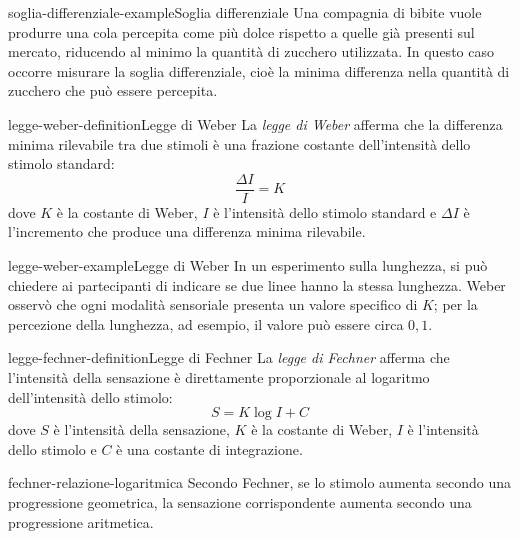 \documentclass[preview]{standalone}
\begin{document}
\begin{snippetexample}{soglia-differenziale-example}{Soglia differenziale}
    Una compagnia di bibite vuole produrre una cola percepita come più dolce
    rispetto a quelle già presenti sul mercato, riducendo al minimo la quantità
    di zucchero utilizzata. In questo caso occorre misurare la soglia
    differenziale, cioè la minima differenza nella quantità di zucchero che può
    essere percepita.
\end{snippetexample}

\begin{snippetdefinition}{legge-weber-definition}{Legge di Weber}
    La \emph{legge di Weber} afferma che la differenza minima rilevabile tra
    due stimoli è una frazione costante dell'intensità dello stimolo standard:
    \[
        \frac{\Delta I}{I} = K
    \]
    dove \(K\) è la costante di Weber, \(I\) è l'intensità dello stimolo
    standard e \(\Delta I\) è l'incremento che produce una differenza minima
    rilevabile.
\end{snippetdefinition}

\begin{snippetexample}{legge-weber-example}{Legge di Weber}
    In un esperimento sulla lunghezza, si può chiedere ai partecipanti di
    indicare se due linee hanno la stessa lunghezza. Weber osservò che ogni
    modalità sensoriale presenta un valore specifico di \(K\); per la
    percezione della lunghezza, ad esempio, il valore può essere circa
    \(0{,}1\).
\end{snippetexample}


\begin{snippetdefinition}{legge-fechner-definition}{Legge di Fechner}
    La \emph{legge di Fechner} afferma che l'intensità della sensazione è
    direttamente proporzionale al logaritmo dell'intensità dello stimolo:
    \[
        S = K \log I + C
    \]
    dove \(S\) è l'intensità della sensazione, \(K\) è la costante di Weber,
    \(I\) è l'intensità dello stimolo e \(C\) è una costante di integrazione.
\end{snippetdefinition}

\begin{snippet}{fechner-relazione-logaritmica}
    Secondo Fechner, se lo stimolo aumenta secondo una progressione geometrica,
    la sensazione corrispondente aumenta secondo una progressione aritmetica.
\end{snippet}

\end{document}

